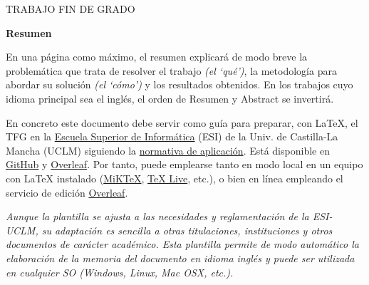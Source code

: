 \pagestyle{plain}	%

%
%

\makeatletter
\begin{center} %
   {\textsc{TRABAJO FIN DE GRADO}\par}
   \vspace{1cm} %
   {\textbf{\Large\@tituloCorto}\par}
   \vspace{0.4cm} %
   {\@autor \par} 
   \vspace{0.9cm} %
   {\textbf{\large\textsf{Resumen}}\par} %
\end{center}   
\makeatother %
En una página como máximo, el resumen explicará de modo breve la problemática que trata de resolver el trabajo \emph{(el `qué')}, la metodología para  abordar su solución  \emph{(el `cómo')} y los resultados obtenidos. En los trabajos cuyo idioma principal sea el inglés, el orden de \textsf{Resumen} y \textsf{Abstract} se invertirá.

En concreto este documento debe servir como guía para preparar, con LaTeX, el TFG en la \href{http://webpub.esi.uclm.es/}{Escuela Superior de Informática} (ESI) de la Univ. de Castilla-La Mancha (UCLM) siguiendo la \href{https://pruebasaluuclm.sharepoint.com/sites/esicr/tfg/SitePages/Inicio.aspx}{normativa de aplicación}. Está disponible en \href{https://github.com/JesusSalido/TFG_ESI_UCLM}{GitHub} y \href{https://www.overleaf.com/latex/templates/plantilla-de-tfg-escuela-superior-de-informatica-uclm/phjgscmfqtsw}{Overleaf}. Por tanto, puede emplearse tanto en modo local en un equipo con LaTeX instalado (\href{https://miktex.org/}{MiKTeX}, \href{https://www.tug.org/texlive/}{TeX Live}, etc.), o bien en línea empleando el servicio de edición \href{https://www.overleaf.com/latex/templates/plantilla-de-tfg-escuela-superior-de-informatica-uclm/phjgscmfqtsw}{Overleaf}.

\emph{Aunque la plantilla se ajusta a las necesidades y reglamentación de la ESI-UCLM, su adaptación es sencilla a otras titulaciones, instituciones y otros documentos de carácter académico. Esta plantilla permite de modo automático la elaboración de la memoria del documento en idioma inglés y puede ser utilizada en cualquier SO (Windows, Linux, Mac OSX, etc.).}



